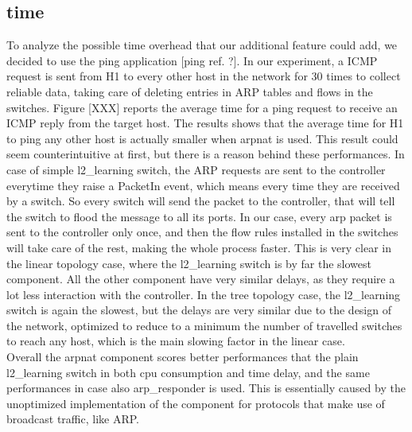 \documentclass[11pt]{article}
\begin{document}
\subsection{time}
To analyze the possible time overhead that our additional feature could add, we decided to use the ping application [ping ref. ?]. In our experiment, a ICMP request is sent from H1 to every other host in the network for 30 times to collect reliable data, taking care of deleting entries in ARP tables and flows in the switches. Figure [XXX] reports the average time for a ping request to receive an ICMP reply from the target host. The results shows that the average time for H1 to ping any other host is actually smaller when arpnat is used. This result could seem counterintuitive at first, but there is a reason behind these performances. In case of simple l2\_learning switch, the ARP requests are sent to the controller everytime they raise a PacketIn event, which means every time they are received by a switch. So every switch will send the packet to the controller, that will tell the switch to flood the message to all its ports. In our case, every arp packet is sent to the controller only once, and then the flow rules installed in the switches will take care of the rest, making the whole process faster.
This is very clear in the linear topology case, where the l2\_learning switch is by far the slowest component. All the other component have very similar delays, as they require a lot less interaction with the controller.
In the tree topology case, the l2\_learning switch is again the slowest, but the delays are very similar due to the design of the network, optimized to reduce to a minimum the number of travelled switches to reach any host, which is the main slowing factor in the linear case.\\
Overall the arpnat component scores better performances that the plain l2\_learning switch in both cpu consumption and time delay, and the same performances in case also arp\_responder is used. This is essentially caused by the unoptimized implementation of the component for protocols that make use of broadcast traffic, like ARP.
\end{document}
